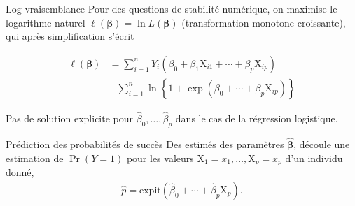 \documentclass[
  ignorenonframetext,
]{beamer}
\begin{document}
\begin{frame}{Log vraisemblance}
\protect\hypertarget{log-vraisemblance}{}
Pour des questions de stabilité numérique, on maximise le logarithme
naturel \(\ell(\boldsymbol{\beta}) = \ln L(\boldsymbol{\beta})\)
(transformation monotone croissante), qui après simplification s'écrit

\begin{align*}
 \ell(\boldsymbol{\beta}) &= \sum_{i=1}^n Y_i ( \beta_0 + \beta_1 \mathrm{X}_{i1} + \cdots + \beta_p \mathrm{X}_{ip}) \\&- \sum_{i=1}^n \ln\left\{1+\exp(\beta_0 + \cdots + \beta_p\mathrm{X}_{ip})\right\}
\end{align*}

Pas de solution explicite pour
\(\widehat{\beta}_0, \ldots, \widehat{\beta}_p\) dans le cas de la
régression logistique.
\end{frame}

\begin{frame}{Prédiction des probabilités de succès}
\protect\hypertarget{pruxe9diction-des-probabilituxe9s-de-succuxe8s}{}
Des estimés des paramètres \(\widehat{\boldsymbol{\beta}}\), découle une
estimation de \(\Pr(Y=1)\) pour les valeurs
\(\mathrm{X}_1=x_1, \ldots, \mathrm{X}_p=x_p\) d'un individu donné,
\begin{align*}
 \widehat{p} = \textrm{expit}(\widehat{\beta}_0 + \cdots + \widehat{\beta}_p\mathrm{X}_p).
\end{align*}
\end{frame}
\end{document}
